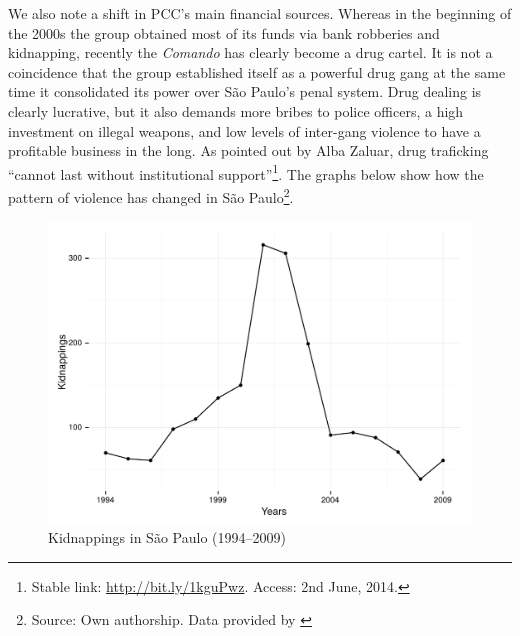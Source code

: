We also note a shift in PCC's main financial sources. Whereas in the beginning of the 2000s the group obtained most of its funds via bank robberies and kidnapping, recently the \textit{Comando} has clearly become a drug cartel. It is not a coincidence that the group established itself as a powerful drug gang at the same time it consolidated its power over S\~{a}o Paulo's penal system. Drug dealing is clearly lucrative, but it also demands more bribes to police officers, a high investment on illegal weapons, and low levels of inter-gang violence to have a profitable business in the long. As pointed out by Alba Zaluar, drug traficking ``cannot last without institutional support''\footnote{Stable link: \href{http://bit.ly/1kguPwz}{http://bit.ly/1kguPwz}. Access: 2nd June, 2014.}. The graphs below show how the pattern of violence has changed in S\~{a}o Paulo\footnote{Source: Own authorship. Data provided by \citet[76]{dias2011pulverizaccao}}. 


\begin{center}
\begin{figure}[bth!]
\includegraphics[height = 8cm, width = 1\linewidth]{gfx/fig7}
\caption[Kidnappings in S\~{a}o Paulo (1994--2009)]{Kidnappings in S\~{a}o Paulo (1994--2009)}
\label{fig:fig7}
\end{figure}
\end{center}

\newpage

